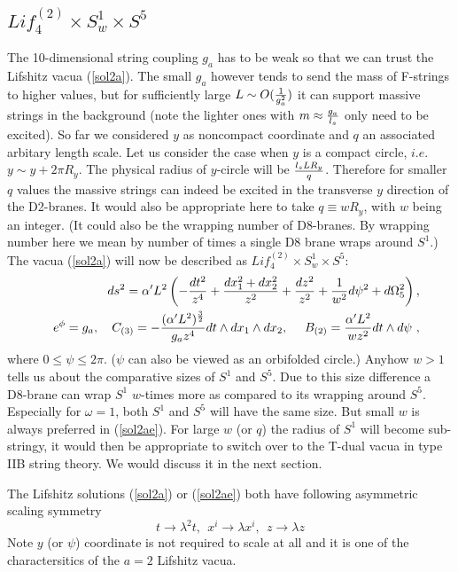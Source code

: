 \documentclass[12pt]{article}
\def\be{\begin{equation}} \def\ee{\end{equation}}
\def\bea{\begin{eqnarray}} \def\eea{\end{eqnarray}} \def\ba{\begin{array}}
\newcommand{\eqn}[1]{(\ref{#1})}
\def\br{\nonumber\\}
\begin{document}
\subsection{ $Lif_4^{(2)} \times S^1_w \times S^5$}
The 10-dimensional string coupling  $g_a$ 
has to be weak so that we can trust the Lifshitz   vacua  \eqn{sol2a}. 
The small $g_a$ however   tends to send the mass of  F-strings
to higher values, but for sufficiently  large  
$L\sim O({1\over g_a^2})$ it
can  support  massive strings in the background (note the lighter ones with 
$m\approx {g_a\over  l_s}$ only need to be excited). 
So far we considered $y$ as  noncompact coordinate
and $q$  an associated arbitary 
length scale. Let us consider the case 
when  $y$ is a compact circle, $i.e.$ $y\sim y+2\pi R_y$. 
The physical radius of  $y$-circle will be $ {l_s L R_y \over q}$. 
Therefore for smaller $q$  values the massive strings can  indeed be excited 
in the transverse  $y$ direction of the D2-branes. It would  also
be appropriate here to take 
$q\equiv w R_y$,  with $w$ being an integer. (It could also be
the wrapping number of D8-branes. By wrapping number here we mean by 
number of times a single D8 brane wraps around $S^1$.) 
The vacua \eqn{sol2a}  will now be described as 
$Lif_4^{(2)} \times S^1_w \times S^5$:
\bea\label{sol2ae}
&&ds^2=\alpha' L^2\left(- {dt^2\over  z^4} +{dx_1^2+dx_2^2\over z^2}+{dz^2\over
z^2}  +{1\over  w^2} d\psi^2 + d\Omega_5^2 \right) ,\br
&&e^\phi=g_a, ~~~C_{(3)}= -{(\alpha' L^2)^{3\over 2} \over g_a  z^4}dt\wedge dx_1\wedge dx_2, ~~~~
B_{(2)}=  {\alpha' L^2\over w z^2}dt\wedge d\psi  \ ,
\eea 
where $0\le \psi\le 2\pi$. 
($\psi$  can also be viewed as an orbifolded circle.) 
 Anyhow $w>1$ tells us about the comparative sizes of $S^1$ and $S^5$. 
Due to this size difference a D8-brane can wrap $S^1$ $w$-times more 
as compared to its wrapping around $S^5$. 
Especially for $\omega=1$, 
both $S^1$ and $S^5$ will have the same size. 
But small $w$  is always preferred in \eqn{sol2ae}. 
For large $w$ (or $q$)  the radius of $S^1$ will  
 become sub-stringy, it would then be appropriate to switch over to the 
T-dual  vacua in type IIB string theory. 
We would discuss it in the next section.       

The  Lifshitz solutions  \eqn{sol2a} or \eqn{sol2ae} both have  
following asymmetric scaling  symmetry
\be
t\to \lambda^2 t,~~
x^{i}\to \lambda x^{i},~~
z\to \lambda z
\ee
Note $y$ (or $\psi$)  coordinate is not required to scale at all 
and it is one of the charactersitics
of the $a=2$ Lifshitz vacua.
\end{document}
